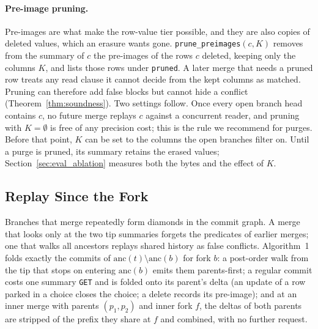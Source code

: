\documentclass[sigconf, nonacm]{acmart}
\begin{document}
\paragraph{Pre-image pruning.} Pre-images are what make the row-value tier possible, and they are also copies of deleted values, which an erasure wants gone. \texttt{prune\_preimages}$(c, K)$ removes from the summary of $c$ the pre-images of the rows $c$ deleted, keeping only the columns $K$, and lists those rows under \texttt{pruned}. A later merge that needs a pruned row treats any read clause it cannot decide from the kept columns as matched. Pruning can therefore add false blocks but cannot hide a conflict (Theorem~\ref{thm:soundness}). Two settings follow. Once every open branch head contains $c$, no future merge replays $c$ against a concurrent reader, and pruning with $K = \emptyset$ is free of any precision cost; this is the rule we recommend for purges. Before that point, $K$ can be set to the columns the open branches filter on. Until a purge is pruned, its summary retains the erased values; Section~\ref{sec:eval_ablation} measures both the bytes and the effect of $K$.

\subsection{Replay Since the Fork}
\label{sec:design_replay}

Branches that merge repeatedly form diamonds in the commit graph. A merge that looks only at the two tip summaries forgets the predicates of earlier merges; one that walks all ancestors replays shared history as false conflicts. Algorithm~1 folds exactly the commits of $\text{anc}(t) \setminus \text{anc}(b)$ for fork $b$: a post-order walk from the tip that stops on entering $\text{anc}(b)$ emits them parents-first; a regular commit costs one summary \texttt{GET} and is folded onto its parent's delta (an update of a row parked in a choice closes the choice; a delete records its pre-image); and at an inner merge with parents $(p_1, p_2)$ and inner fork $f$, the deltas of both parents are stripped of the prefix they share at $f$ and combined, with no further request.
\end{document}
